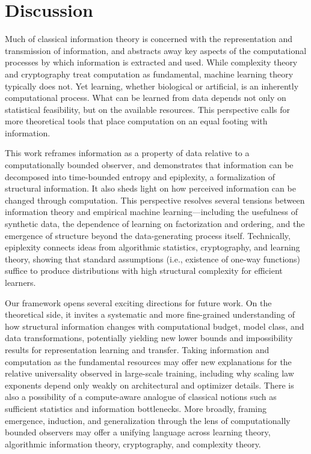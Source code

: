 \documentclass[twoside]{article}
\begin{document}
\fi

\section{Discussion}

Much of classical information theory is concerned with the representation and transmission of information, and abstracts away key aspects of the computational processes by which information is extracted and used. While complexity theory and cryptography treat computation as fundamental, machine learning theory typically does not.
Yet learning, whether biological or artificial, is an inherently computational process. What can be learned from data depends not only on statistical feasibility, but on the available resources. This perspective calls for more theoretical tools that place computation on an equal footing with information.

This work reframes information as a property of data relative to a computationally bounded observer, and demonstrates that information can be decomposed into time-bounded entropy and epiplexity, a formalization of structural information. It also sheds light on how perceived information can be changed through computation. This perspective resolves several tensions between information theory and empirical machine learning---including the usefulness of synthetic data, the dependence of learning on factorization and ordering, and the emergence of structure beyond the data-generating process itself. Technically, epiplexity connects ideas from algorithmic statistics, cryptography, and learning theory, showing that standard assumptions (i.e., existence of one-way functions) suffice to produce distributions with high structural complexity for efficient learners.

Our framework opens several exciting directions for future work. On the theoretical side, it invites a systematic and more fine-grained understanding of how structural information changes with computational budget, model class, and data transformations, potentially yielding new lower bounds and impossibility results for representation learning and transfer. Taking information and computation as the fundamental resources may offer new explanations for the relative universality observed in large-scale training, including why scaling law exponents depend only weakly on architectural and optimizer details.
There is also a possibility of a compute-aware analogue of classical notions such as sufficient statistics and information bottlenecks. 
More broadly, framing emergence, induction, and generalization through the lens of computationally bounded observers may offer a unifying language across learning theory, algorithmic information theory, cryptography, and complexity theory.
\end{document}
